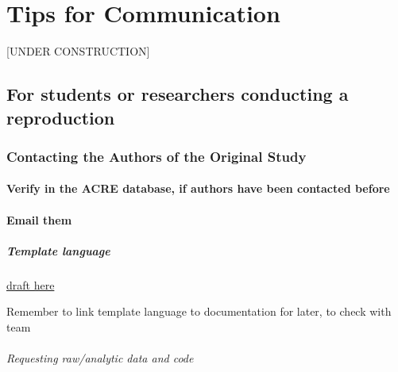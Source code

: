 \documentclass[]{book}
\let\oldparagraph\paragraph
\renewcommand{\paragraph}[1]{\oldparagraph{#1}\mbox{}}
\let\oldsubparagraph\subparagraph
\renewcommand{\subparagraph}[1]{\oldsubparagraph{#1}\mbox{}}
\begin{document}
\hypertarget{tips-for-communication}{%
\chapter{Tips for Communication}\label{tips-for-communication}}

{[}UNDER CONSTRUCTION{]}

\hypertarget{for-students-or-researchers-conducting-a-reproduction}{%
\section{For students or researchers conducting a reproduction}\label{for-students-or-researchers-conducting-a-reproduction}}

\hypertarget{contacting-the-authors-of-the-original-study}{%
\subsection{Contacting the Authors of the Original Study}\label{contacting-the-authors-of-the-original-study}}

\hypertarget{verify-in-the-acre-database-if-authors-have-been-contacted-before}{%
\subsubsection{Verify in the ACRE database, if authors have been contacted before}\label{verify-in-the-acre-database-if-authors-have-been-contacted-before}}

\hypertarget{email-them}{%
\subsubsection{Email them}\label{email-them}}

\hypertarget{template-language}{%
\paragraph{Template language}\label{template-language}}

\href{https://docs.google.com/document/d/1xJ7pZTQ1VQXVCrs6IUlp7HlBB4oxYha0oOniCG2SWLM/edit?ts=5d251563}{draft here}

Remember to link template language to documentation for later, to check with team

\hypertarget{requesting-rawanalytic-data-and-code}{%
\subparagraph{Requesting raw/analytic data and code}\label{requesting-rawanalytic-data-and-code}}
\end{document}
